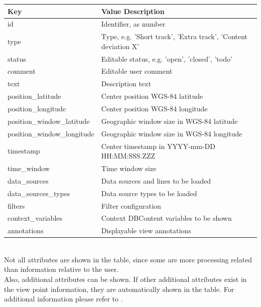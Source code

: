 \begin{center}
 \begin{table}[H]
  \begin{tabularx}{\textwidth}{ | l | X | }
    \hline
    \textbf{Key} & \textbf{Value Description} \\ \hline
    id & Identifier, as number \\ \hline
    type & Type, e.g. 'Short track', 'Extra track', 'Content deviation X'  \\ \hline
    status & Editable status, e.g. 'open', 'closed', 'todo' \\ \hline
    comment & Editable user comment \\ \hline
    text & Description text \\ \hline
    position\_latitude & Center position WGS-84 latitude \\ \hline
    position\_longitude & Center position WGS-84 longitude \\ \hline
    position\_window\_latitude & Geographic window size in WGS-84 latitude  \\ \hline
    position\_window\_longitude & Geographic window size in WGS-84 longitude  \\ \hline
    timestamp & Center timestamp in YYYY-mm-DD HH:MM:SSS.ZZZ  \\ \hline
    time\_window & Time window size \\ \hline
    data\_sources & Data sources and lines to be loaded \\ \hline
    data\_sources\_types & Data source types to be loaded \\ \hline
    filters & Filter configuration \\ \hline
    context\_variables & Context DBContent variables to be shown \\ \hline
    annotations & Displayable view annotations \\ \hline
\end{tabularx}
\end{table}
\end{center}
\ \\

Not all attributes are shown in the table, since some are more processing related than information relative to the user. \\

Also, additional attributes can be shown. If other additional attributes exist in the view point information, they are automatically shown in the table. For additional information please refer to . \\

